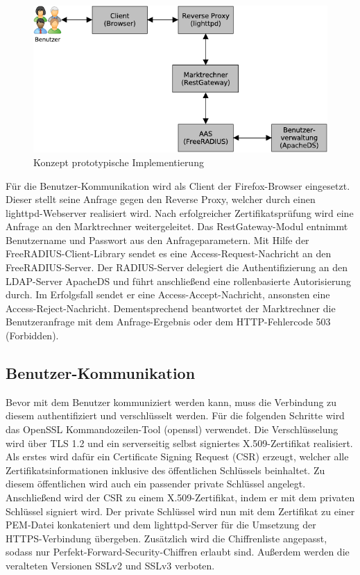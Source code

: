 \documentclass[11pt,a4paper]{report}
\begin{document}
\begin{figure}[htbp]
\centering
\includegraphics[scale=1]{images/design_architekture.pdf}
\caption{Konzept prototypische Implementierung}
\label{fig:konzept_proto_impl}
\end{figure}

Für die Benutzer-Kommunikation wird als Client der Firefox-Browser eingesetzt. Dieser stellt seine Anfrage gegen den Reverse Proxy, welcher durch einen lighttpd-Webserver realisiert wird. Nach erfolgreicher Zertifikatsprüfung wird eine Anfrage an den Marktrechner weitergeleitet. Das RestGateway-Modul entnimmt Benutzername und Passwort aus den Anfrageparametern. Mit Hilfe der FreeRADIUS-Client-Library sendet es eine Access-Request-Nachricht an den FreeRADIUS-Server. Der RADIUS-Server delegiert die Authentifizierung an den LDAP-Server ApacheDS und führt anschließend eine rollenbasierte Autorisierung durch. Im Erfolgsfall sendet er eine Access-Accept-Nachricht, ansonsten eine Access-Reject-Nachricht. Dementsprechend beantwortet der Marktrechner die Benutzeranfrage mit dem Anfrage-Ergebnis oder dem HTTP-Fehlercode 503 (Forbidden).

\subsection{Benutzer-Kommunikation}

Bevor mit dem Benutzer kommuniziert werden kann, muss die Verbindung zu diesem authentifiziert und verschlüsselt werden. Für die folgenden Schritte wird das OpenSSL Kommandozeilen-Tool (openssl) verwendet. Die Verschlüsselung wird über TLS 1.2 und ein serverseitig selbst signiertes X.509-Zertifikat realisiert. Als erstes wird dafür ein Certificate Signing Request (CSR) erzeugt, welcher alle Zertifikatsinformationen inklusive des öffentlichen Schlüssels beinhaltet. Zu diesem öffentlichen wird auch ein passender private Schlüssel angelegt. Anschließend wird der CSR zu einem X.509-Zertifikat, indem er mit dem privaten Schlüssel signiert wird. Der private Schlüssel wird nun mit dem Zertifikat zu einer PEM-Datei konkateniert und dem lighttpd-Server für die Umsetzung der HTTPS-Verbindung übergeben. Zusätzlich wird die Chiffrenliste angepasst, sodass nur Perfekt-Forward-Security-Chiffren erlaubt sind. Außerdem werden die veralteten Versionen SSLv2 und SSLv3 verboten.
\end{document}
